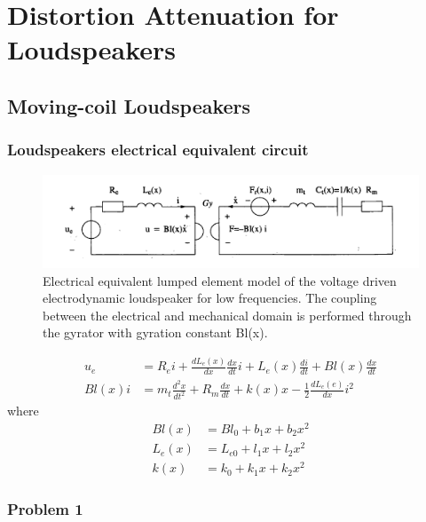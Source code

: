 \documentclass[11pt,a4paper,fleqn, onesside]{report}
\begin{document}
\pagebreak
{}
\setcounter{page}{1}
\setcounter{tocdepth}{4}
\setcounter{secnumdepth}{4} 
\tableofcontents
\newpage
{}
\def\chaptername{Exercice}


\chapter{Distortion Attenuation for Loudspeakers}
\section{Moving-coil Loudspeakers}
\subsection{Loudspeakers electrical equivalent circuit}

\begin{figure}[H]
\includegraphics[scale=.6]{figures/circuit.png}
\caption{Electrical equivalent lumped element model of the voltage driven electrodynamic loudspeaker for low frequencies. The coupling between the electrical and mechanical domain is performed through the gyrator with gyration constant Bl(x).}
\label{circuit}
\end{figure}

\begin{align} 
  u_e &= R_ei+\frac{dL_e(x)}{dx}\frac{dx}{dt}i+L_e(x)\frac{di}{dt}+Bl(x)\frac{dx}{dt} \label{eq:1.1} \\     
  Bl(x)i &= m_t\frac{d^2x}{dt^2}+R_m\frac{dx}{dt}+k(x)x-\frac{1}{2}\frac{dL_e(e)}{dx}i^2 \label{eq:1.2}
\end{align}
where
\begin{align}
  Bl(x) &= Bl_0+b_1x+b_2x^2 \label{eq:1.3}  \\
  L_e(x) &= L_{e0}+l_1x+l_2x^2 \label{eq:1.4}  \\
  k(x) &= k_0+k_1x+k_2x^2 \label{eq:1.5} 
\end{align}

\subsection*{Problem 1}

\end{document}
